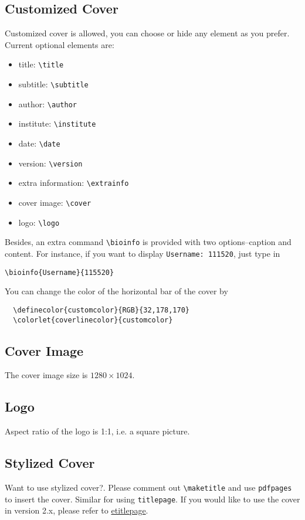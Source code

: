 \subsection{Customized Cover}
Customized cover is allowed, you can choose or hide any element as you prefer. Current optional elements are:
\begin{itemize}
    \item title: \lstinline{\title}
    \item subtitle: \lstinline{\subtitle}
    \item author: \lstinline{\author}
    \item institute: \lstinline{\institute}
    \item date: \lstinline{\date}
    \item version: \lstinline{\version}
    \item extra information: \lstinline{\extrainfo}
    \item cover image: \lstinline{\cover}
    \item logo: \lstinline{\logo}
\end{itemize}

Besides, an extra command \lstinline{\bioinfo} is provided with two options--caption and content. For instance, if you want to display \lstinline{Username: 111520}, just type in

\begin{lstlisting}
\bioinfo{Username}{115520}
\end{lstlisting}

You can change the color of the horizontal bar of the cover by
\begin{lstlisting}
  \definecolor{customcolor}{RGB}{32,178,170}
  \colorlet{coverlinecolor}{customcolor}
\end{lstlisting}

\subsection{Cover Image}
The cover image size is $1280 \times 1024$.

\subsection{Logo}
Aspect ratio of the logo is 1:1, i.e. a square picture.

\subsection{Stylized Cover}
Want to use stylized cover?. Please comment out \lstinline{\maketitle} and use \lstinline{pdfpages} to insert the
cover. Similar for using \lstinline{titlepage}. If you would like to use the cover in version 2.x, please refer to \href{https://github.com/EthanDeng/etitlepage}{etitlepage}.


